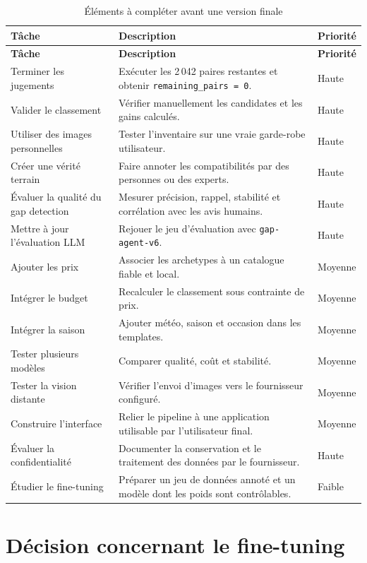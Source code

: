 \documentclass[11pt,a4paper]{article}
\begin{document}
\begin{longtable}{p{4.8cm} p{7.2cm} p{2.3cm}}
\caption{Éléments à compléter avant une version finale} \\
\toprule
\textbf{Tâche} & \textbf{Description} & \textbf{Priorité} \\
\midrule
\endfirsthead
\toprule
\textbf{Tâche} & \textbf{Description} & \textbf{Priorité} \\
\midrule
\endhead
Terminer les jugements & Exécuter les 2\,042 paires restantes et obtenir
\texttt{remaining\_pairs = 0}. & Haute \\
Valider le classement & Vérifier manuellement les candidates et les gains
calculés. & Haute \\
Utiliser des images personnelles & Tester l'inventaire sur une vraie
garde-robe utilisateur. & Haute \\
Créer une vérité terrain & Faire annoter les compatibilités par des personnes
ou des experts. & Haute \\
Évaluer la qualité du gap detection & Mesurer précision, rappel, stabilité et
corrélation avec les avis humains. & Haute \\
Mettre à jour l'évaluation LLM & Rejouer le jeu d'évaluation avec
\texttt{gap-agent-v6}. & Haute \\
Ajouter les prix & Associer les archetypes à un catalogue fiable et local. &
Moyenne \\
Intégrer le budget & Recalculer le classement sous contrainte de prix. &
Moyenne \\
Intégrer la saison & Ajouter météo, saison et occasion dans les templates. &
Moyenne \\
Tester plusieurs modèles & Comparer qualité, coût et stabilité. & Moyenne \\
Tester la vision distante & Vérifier l'envoi d'images vers le fournisseur
configuré. & Moyenne \\
Construire l'interface & Relier le pipeline à une application utilisable par
l'utilisateur final. & Moyenne \\
Évaluer la confidentialité & Documenter la conservation et le traitement des
données par le fournisseur. & Haute \\
Étudier le fine-tuning & Préparer un jeu de données annoté et un modèle dont
les poids sont contrôlables. & Faible \\
\bottomrule
\end{longtable}

\section{Décision concernant le fine-tuning}
\end{document}
